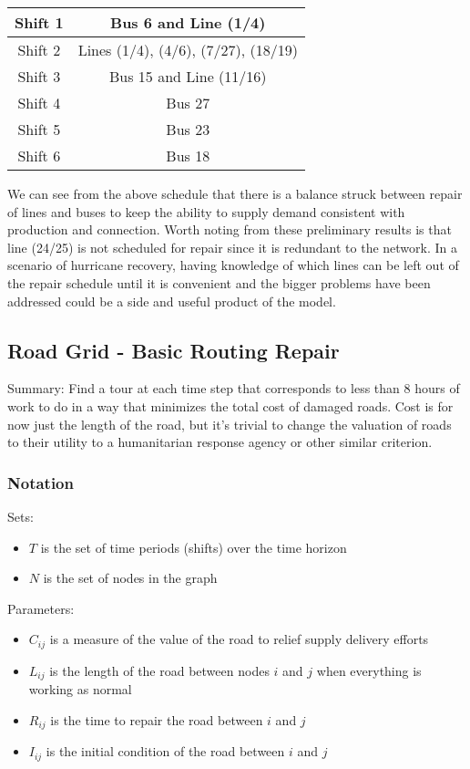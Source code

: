 \documentclass{article}
\begin{document}
		{\centering
	\begin{tabular}{|c|c|}
		\hline
		Shift 1 & Bus 6 and Line (1/4) \\
		\hline
		Shift 2 & Lines (1/4), (4/6), (7/27), (18/19) \\
		\hline
		Shift 3 & Bus 15 and Line (11/16) \\
		\hline
		Shift 4 & Bus 27 \\
		\hline
		Shift 5 & Bus 23 \\
		\hline
		Shift 6 & Bus 18 \\
		\hline
	\end{tabular}\par
}
	
	We can see from the above schedule that there is a balance struck between repair of lines and buses to keep the ability to supply demand consistent with production and connection. Worth noting from these preliminary results is that line (24/25) is not scheduled for repair since it is redundant to the network. In a scenario of hurricane recovery, having knowledge of which lines can be left out of the repair schedule until it is convenient and the bigger problems have been addressed could be a side and useful product of the model. 
	  
	\subsection{Road Grid - Basic Routing Repair}
	Summary: Find a tour at each time step that corresponds to less than 8 hours of work to do in a way that minimizes the total cost of damaged roads. Cost is for now just the length of the road, but it's trivial to change the valuation of roads to their utility to a humanitarian response agency or other similar criterion.
	
	\subsubsection{Notation}
Sets:
	\begin{itemize}
		\item $T$ is the set of time periods (shifts) over the time horizon
		\item $N$ is the set of nodes in the graph
	\end{itemize}

Parameters:
	\begin{itemize}
		\item $C_{ij}$ is a measure of the value of the road to relief supply delivery efforts
		\item $L_{ij}$ is the length of the road between nodes $i$ and $j$ when everything is working as normal
		\item $R_{ij}$ is the time to repair the road between $i$ and $j$
		\item $I_{ij}$ is the initial condition of the road between $i$ and $j$
	\end{itemize}
	
\end{document}
